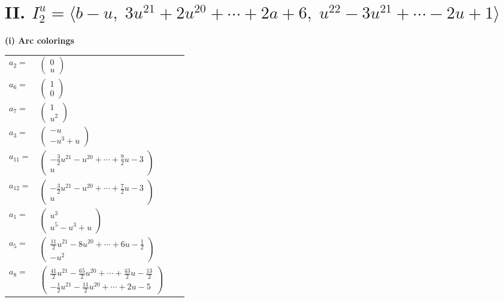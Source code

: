 \documentclass[1p]{elsarticle_modified}
\theoremstyle{definition}
\begin{document}
\centering \section*{II. $I^u_{2}= \langle b- u,\;3 u^{21}+2 u^{20}+\cdots+2 a+6,\;u^{22}-3 u^{21}+\cdots-2 u+1 \rangle$}
\flushleft \textbf{(i) Arc colorings}\\
\begin{tabular}{m{7pt} m{180pt} m{7pt} m{180pt} }
\flushright $a_{2}=$&$\begin{pmatrix}0\\u\end{pmatrix}$ \\
\flushright $a_{6}=$&$\begin{pmatrix}1\\0\end{pmatrix}$ \\
\flushright $a_{7}=$&$\begin{pmatrix}1\\u^2\end{pmatrix}$ \\
\flushright $a_{3}=$&$\begin{pmatrix}- u\\- u^3+u\end{pmatrix}$ \\
\flushright $a_{11}=$&$\begin{pmatrix}-\frac{3}{2} u^{21}- u^{20}+\cdots+\frac{9}{2} u-3\\u\end{pmatrix}$ \\
\flushright $a_{12}=$&$\begin{pmatrix}-\frac{3}{2} u^{21}- u^{20}+\cdots+\frac{7}{2} u-3\\u\end{pmatrix}$ \\
\flushright $a_{1}=$&$\begin{pmatrix}u^3\\u^5- u^3+u\end{pmatrix}$ \\
\flushright $a_{5}=$&$\begin{pmatrix}\frac{11}{2} u^{21}-8 u^{20}+\cdots+6 u-\frac{1}{2}\\- u^2\end{pmatrix}$ \\
\flushright $a_{8}=$&$\begin{pmatrix}\frac{41}{2} u^{21}-\frac{65}{2} u^{20}+\cdots+\frac{43}{2} u-\frac{13}{2}\\-\frac{1}{2} u^{21}-\frac{11}{2} u^{20}+\cdots+2 u-5\end{pmatrix}$ \\

\end{tabular}
\end{document}
